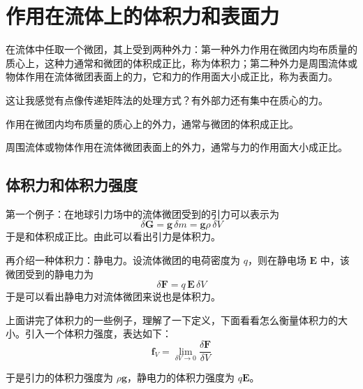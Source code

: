 \section{作用在流体上的体积力和表面力}

在流体中任取一个微团，其上受到两种外力：第一种外力作用在微团内均布质量的质心上，这种力通常和微团的体积成正比，称为体积力；第二种外力是周围流体或物体作用在流体微团表面上的力，它和力的作用面大小成正比，称为表面力。

\begin{note}
	这让我感觉有点像传递矩阵法的处理方式？有外部力还有集中在质心的力。
\end{note}

\begin{definition}[体积力]
	作用在微团内均布质量的质心上的外力，通常与微团的体积成正比。
\end{definition}

\begin{definition}[表面力]
	周围流体或物体作用在流体微团表面上的外力，通常与力的作用面大小成正比。
\end{definition}

\subsection{体积力和体积力强度}

第一个例子：在地球引力场中的流体微团受到的引力可以表示为
\begin{equation}\label{eq:gravity}
	\delta\boldsymbol{G}=\boldsymbol{g}\,\delta m=\boldsymbol{g}\rho\,\delta V
\end{equation}
于是和体积成正比。由此可以看出引力是体积力。

再介绍一种体积力：静电力。设流体微团的电荷密度为 $q$，则在静电场 $\boldsymbol{E}$ 中，该微团受到的静电力为
\begin{equation}\label{eq:electrostatic}
	\delta\boldsymbol{F}=q\,\boldsymbol{E}\,\delta V
\end{equation}
于是可以看出静电力对流体微团来说也是体积力。

上面讲完了体积力的一些例子，理解了一下定义，下面看看怎么衡量体积力的大小。引入一个体积力强度，表达如下：
\begin{equation}\label{eq:bodyforce-intensity-def}
	\boldsymbol{f}_V=\lim_{\delta V\to 0}\frac{\delta\boldsymbol{F}}{\delta V}
\end{equation}

于是引力的体积力强度为 $\rho\boldsymbol{g}$，静电力的体积力强度为 $q\boldsymbol{E}$。

